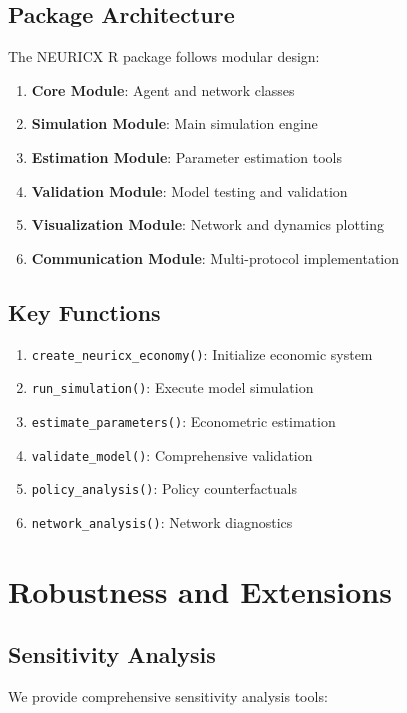 \documentclass[12pt,a4paper]{article}
\begin{document}
\subsection{Package Architecture}

The NEURICX R package follows modular design:

\begin{enumerate}
\item \textbf{Core Module}: Agent and network classes
\item \textbf{Simulation Module}: Main simulation engine  
\item \textbf{Estimation Module}: Parameter estimation tools
\item \textbf{Validation Module}: Model testing and validation
\item \textbf{Visualization Module}: Network and dynamics plotting
\item \textbf{Communication Module}: Multi-protocol implementation
\end{enumerate}

\subsection{Key Functions}

\begin{enumerate}
\item \texttt{create\_neuricx\_economy()}: Initialize economic system
\item \texttt{run\_simulation()}: Execute model simulation
\item \texttt{estimate\_parameters()}: Econometric estimation
\item \texttt{validate\_model()}: Comprehensive validation
\item \texttt{policy\_analysis()}: Policy counterfactuals
\item \texttt{network\_analysis()}: Network diagnostics
\end{enumerate}

\section{Robustness and Extensions}

\subsection{Sensitivity Analysis}

We provide comprehensive sensitivity analysis tools:
\end{document}
